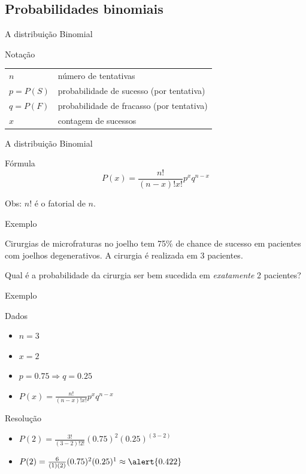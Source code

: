 \documentclass{beamer}
\begin{document}
\subsection{Probabilidades binomiais}

\begin{frame}{A distribuição Binomial}
  \begin{block}{Notação}
    \begin{tabular}{ll}
      $n$& número de tentativas \\
$p = P(S)$ & probabilidade de sucesso (por tentativa)\\
$q = P(F)$ & probabilidade de fracasso (por tentativa)\\
$x$ & contagem de sucessos\\
    \end{tabular}
  \end{block}
\end{frame}

\begin{frame}{A distribuição Binomial}
  \begin{block}{Fórmula}
    \begin{displaymath}
      P(x) = \frac{n!}{(n-x)!x!}p^x q^{n-x}
    \end{displaymath}
  \end{block}

  \vfill
  \centering
  Obs: $n!$ é o \alert{fatorial} de $n$.
\end{frame}

\begin{frame}{Exemplo}
  \begin{example}
    Cirurgias de microfraturas no joelho tem 75\% de chance de sucesso em pacientes com joelhos degenerativos.
    A cirurgia é realizada em 3 pacientes.

    \bigskip
    Qual é a probabilidade da cirurgia ser bem sucedida em {\em exatamente} 2 pacientes?
  \end{example}
\end{frame}

\begin{frame}{Exemplo}
  \begin{block}{Dados}
    \begin{itemize}
    \item $n = 3$
    \item $x = 2$
    \item $p = 0.75 \Rightarrow q = 0.25$
    \item $P(x) = \frac{n!}{(n-x)!x!}p^x q^{n-x}$
    \end{itemize}
  \end{block}
  \begin{block}{Resolução}
    \begin{itemize}
    \item $P(2) = \frac{3!}{(3-2)!2!}(0.75)^{2} (0.25)^{(3-2)}$
    \item $P(2) = \frac{6}{(1)(2)}(0.75)^{2} (0.25)^{1} \approx \alert{0.422}$
    \end{itemize}
  \end{block}
\end{frame}
\end{document}
